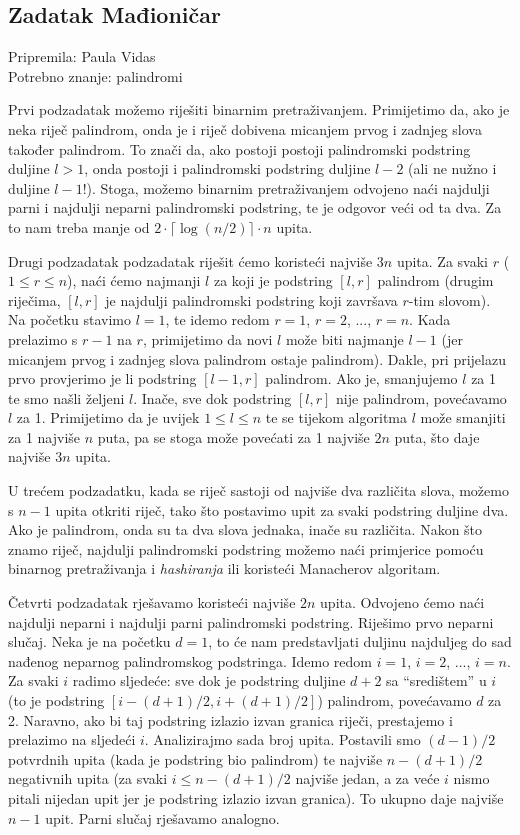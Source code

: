 \subsection*{Zadatak Mađioničar}
\textsf{Pripremila: Paula Vidas}\\
\textsf{Potrebno znanje: palindromi}

Prvi podzadatak možemo riješiti binarnim pretraživanjem. Primijetimo da, ako je
neka riječ palindrom, onda je i riječ dobivena micanjem prvog i zadnjeg slova također palindrom.
To znači da, ako postoji postoji palindromski podstring duljine $l > 1$, onda postoji i palindromski podstring duljine $l - 2$ (ali ne nužno i duljine $l - 1$!).
Stoga, možemo binarnim pretraživanjem odvojeno naći najdulji parni i najdulji neparni palindromski podstring, te je odgovor veći od ta dva.
Za to nam treba manje od $2 \cdot \lceil{\log(n/2)}\rceil \cdot n$ upita.

Drugi podzadatak podzadatak riješit ćemo koristeći najviše $3n$ upita.
Za svaki $r$ ($1 \leq r \leq n$), naći ćemo najmanji $l$ za koji je
podstring $[l, r]$ palindrom (drugim riječima, $[l, r]$ je 
najdulji palindromski podstring koji završava $r$-tim slovom).
Na početku stavimo $l = 1$, te idemo redom $r = 1$, $r = 2$, ..., $r = n$.
Kada prelazimo s $r - 1$ na $r$, primijetimo da novi $l$ može biti najmanje $l - 1$ (jer micanjem prvog i zadnjeg slova palindrom ostaje palindrom). Dakle, pri prijelazu
prvo provjerimo je li podstring $[l - 1, r]$ palindrom. Ako je, smanjujemo $l$ za 1 te smo našli željeni $l$. Inače, sve dok podstring $[l, r]$ nije palindrom, povećavamo $l$ za 1.
Primijetimo da je uvijek $1 \leq l \leq n$ te se tijekom algoritma $l$ može smanjiti za 1 najviše $n$ puta,
pa se stoga može povećati za 1 najviše $2n$ puta, što daje najviše $3n$ upita.

U trećem podzadatku, kada se riječ sastoji od najviše dva različita slova, možemo 
s $n - 1$ upita otkriti riječ, tako što postavimo upit za svaki podstring duljine dva.
Ako je palindrom, onda su ta dva slova jednaka, inače su različita. Nakon što znamo riječ,
najdulji palindromski podstring možemo naći primjerice pomoću binarnog pretraživanja i \textit{hashiranja} ili koristeći Manacherov algoritam.

Četvrti podzadatak rješavamo koristeći najviše $2n$ upita.
Odvojeno ćemo naći najdulji neparni i najdulji parni palindromski podstring.
Riješimo prvo neparni slučaj. Neka je na početku $d = 1$, to će nam predstavljati duljinu
najduljeg do sad nađenog neparnog palindromskog podstringa. Idemo redom $i = 1$, $i = 2$, ..., $i = n$.
Za svaki $i$ radimo sljedeće: sve dok je podstring duljine $d + 2$ sa ``središtem'' u $i$
(to je podstring $[i - (d + 1) / 2, i + (d + 1) / 2]$) palindrom, povećavamo $d$ za 2.
Naravno, ako bi taj podstring izlazio izvan granica riječi, prestajemo i prelazimo na sljedeći $i$.
Analizirajmo sada broj upita. Postavili smo $(d - 1) / 2$ potvrdnih upita (kada je podstring bio palindrom) te najviše $n - (d + 1) / 2$ negativnih upita
(za svaki $i \leq n - (d + 1) / 2$ najviše jedan, a za veće $i$ nismo pitali nijedan upit jer je podstring izlazio izvan granica). To ukupno daje najviše $n - 1$ upit.
Parni slučaj rješavamo analogno. 
